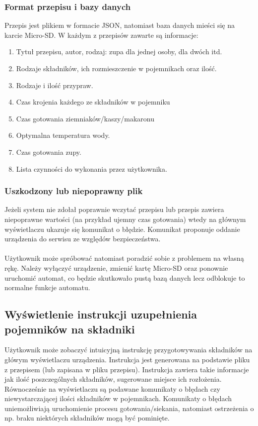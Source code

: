 \documentclass[12pt,a4paper,notitlepage]{report}
\begin{document}
\subsubsection{Format przepisu i bazy danych}
Przepis jest plikiem w formacie JSON, natomiast baza danych mieści się na karcie Micro-SD. W każdym z przepisów zawarte są informacje:
\begin{enumerate}
  \item Tytuł przepisu, autor, rodzaj: zupa dla jednej osoby, dla dwóch itd.
  \item Rodzaje składników, ich rozmieszczenie w pojemnikach oraz ilość.
  \item Rodzaje i ilość przypraw.
  \item Czas krojenia każdego ze składników w pojemniku
  \item Czas gotowania ziemniaków/kaszy/makaronu
  \item Optymalna temperatura wody.
  \item Czas gotowania zupy.
  \item Lista czynności do wykonania przez użytkownika.
\end{enumerate}

\subsubsection{Uszkodzony lub niepoprawny plik}
Jeżeli system nie zdołał poprawnie wczytać przepisu lub przepis zawiera niepoprawne wartości (na przykład ujemny czas gotowania) wtedy na głównym wyświetlaczu ukazuje się komunikat o błędzie. Komunikat proponuje oddanie urządzenia do serwisu ze względów bezpieczeństwa.\\ \\
Użytkownik może spróbować natomiast poradzić sobie z problemem na własną rękę. Należy wyłączyć urządzenie, zmienić kartę Micro-SD oraz ponownie uruchomić automat, co będzie skutkowało pustą bazą danych lecz odblokuje to normalne funkcje automatu.

\subsection{Wyświetlenie instrukcji uzupełnienia pojemników na składniki}
Użytkownik może zobaczyć intuicyjną instrukcję przygotowywania składników na główym wyświetlaczu urządzenia. Instrukcja jest generowana na podstawie pliku z przepisem (lub zapisana w pliku przepisu). Instrukcja zawiera takie informacje jak ilość poszczególnych składników, sugerowane miejsce ich rozłożenia. Równocześnie na wyświetlaczu są podawane komunikaty o błędach czy niewystarczającej ilości składników w pojemnikach. Komunikaty o błędach uniemożliwiają uruchomienie procesu gotowania/siekania, natomiast ostrzeżenia o np. braku niektórych składników mogą być pominięte.
\end{document}
